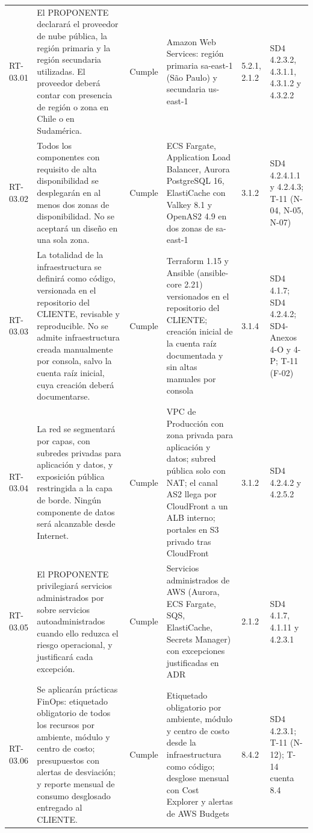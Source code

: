 \documentclass[carta,firma,final]{lafrox}
\begin{document}
\begin{landscape}
{\begin{longtable}{@{}F{0.070} F{0.255} F{0.075} F{0.280} F{0.090} F{0.230}@{}}
  RT-03.01 & El PROPONENTE declarará el proveedor de nube pública, la región primaria y la región secundaria utilizadas. El proveedor deberá contar con presencia de región o zona en Chile o en Sudamérica. & Cumple & Amazon Web Services: región primaria sa-east-1 (São Paulo) y secundaria us-east-1 & 5.2.1, 2.1.2 & SD4 4.2.3.2, 4.3.1.1, 4.3.1.2 y 4.3.2.2 \\
  RT-03.02 & Todos los componentes con requisito de alta disponibilidad se desplegarán en al menos dos zonas de disponibilidad. No se aceptará un diseño en una sola zona. & Cumple & ECS Fargate, Application Load Balancer, Aurora PostgreSQL 16, ElastiCache con Valkey 8.1 y OpenAS2 4.9 en dos zonas de sa-east-1 & 3.1.2 & SD4 4.2.4.1.1 y 4.2.4.3; T-11 (N-04, N-05, N-07) \\
  RT-03.03 & La totalidad de la infraestructura se definirá como código, versionada en el repositorio del CLIENTE, revisable y reproducible. No se admite infraestructura creada manualmente por consola, salvo la cuenta raíz inicial, cuya creación deberá documentarse. & Cumple & Terraform 1.15 y Ansible (ansible-core 2.21) versionados en el repositorio del CLIENTE; creación inicial de la cuenta raíz documentada y sin altas manuales por consola & 3.1.4 & SD4 4.1.7; SD4 4.2.4.2; SD4-Anexos 4-O y 4-P; T-11 (F-02) \\
  RT-03.04 & La red se segmentará por capas, con subredes privadas para aplicación y datos, y exposición pública restringida a la capa de borde. Ningún componente de datos será alcanzable desde Internet. & Cumple & VPC de Producción con zona privada para aplicación y datos; subred pública solo con NAT; el canal AS2 llega por CloudFront a un ALB interno; portales en S3 privado tras CloudFront & 3.1.2 & SD4 4.2.4.2 y 4.2.5.2 \\
  RT-03.05 & El PROPONENTE privilegiará servicios administrados por sobre servicios autoadministrados cuando ello reduzca el riesgo operacional, y justificará cada excepción. & Cumple & Servicios administrados de AWS (Aurora, ECS Fargate, SQS, ElastiCache, Secrets Manager) con excepciones justificadas en ADR & 2.1.2 & SD4 4.1.7, 4.1.11 y 4.2.3.1 \\
  RT-03.06 & Se aplicarán prácticas FinOps: etiquetado obligatorio de todos los recursos por ambiente, módulo y centro de costo; presupuestos con alertas de desviación; y reporte mensual de consumo desglosado entregado al CLIENTE. & Cumple & Etiquetado obligatorio por ambiente, módulo y centro de costo desde la infraestructura como código; desglose mensual con Cost Explorer y alertas de AWS Budgets & 8.4.2 & SD4 4.2.3.1; T-11 (N-12); T-14 cuenta 8.4 \\

\end{longtable}}
\end{landscape}
\end{document}
